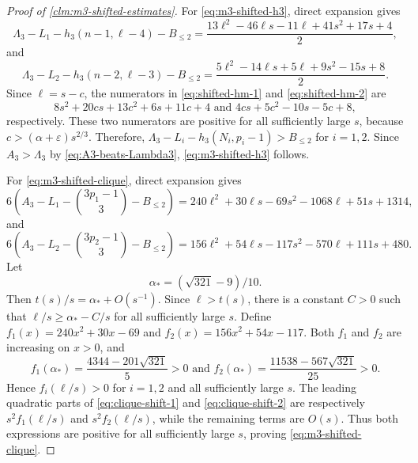 \documentclass[10pt,a4paper]{article}
\numberwithin{equation}{section}
\theoremstyle{definition}
\begin{document}
\begin{proof}[Proof of \cref{clm:m3-shifted-estimates}]
        For \eqref{eq:m3-shifted-h3}, direct expansion gives
        \begin{equation}\label{eq:shifted-hm-1}
                \Lambda_3-L_1-h_3(n-1,\ell-4)-B_{\le2}
                =\frac{13\ell^2-46\ell s-11\ell+41s^2+17s+4}{2},
        \end{equation}
        and
        \begin{equation}\label{eq:shifted-hm-2}
                \Lambda_3-L_2-h_3(n-2,\ell-3)-B_{\le2}
                =\frac{5\ell^2-14\ell s+5\ell+9s^2-15s+8}{2}.
        \end{equation}
        Since $\ell=s-c$, the numerators in \eqref{eq:shifted-hm-1} and \eqref{eq:shifted-hm-2} are
        \[
                8s^2+20cs+13c^2+6s+11c+4 \text{ and } 4cs+5c^2-10s-5c+8,
        \]
        respectively.
        These two numerators are positive for all sufficiently large $s$, because $c>(\alpha+\varepsilon)s^{2/3}$.
        Therefore, $\Lambda_3-L_i-h_3(N_i,p_i-1)>B_{\le2}$ for $i=1,2$.
        Since $A_3>\Lambda_3$ by \eqref{eq:A3-beats-Lambda3}, \eqref{eq:m3-shifted-h3} follows.

        For \eqref{eq:m3-shifted-clique}, direct expansion gives
        \begin{equation}\label{eq:clique-shift-1}
                6\left(A_3-L_1-\binom{3p_1-1}{3}-B_{\le2}\right)
                =240\ell^2+30\ell s-69s^2-1068\ell+51s+1314,
        \end{equation}
        and
        \begin{equation}\label{eq:clique-shift-2}
                6\left(A_3-L_2-\binom{3p_2-1}{3}-B_{\le2}\right)
                =156\ell^2+54\ell s-117s^2-570\ell+111s+480.
        \end{equation}
        Let
        \[
                \alpha_*=(\sqrt{321}-9)/10.
        \]
        Then $t(s)/s=\alpha_*+O(s^{-1})$. Since $\ell>t(s)$, there is a constant $C>0$ such that $\ell/s\ge \alpha_* - C/s$ for all sufficiently large $s$.
        Define $f_1(x)=240x^2+30x-69$ and $f_2(x)=156x^2+54x-117$.
        Both $f_1$ and $f_2$ are increasing on $x>0$, and
        \[
                f_1(\alpha_*)=\frac{4344-201\sqrt{321}}5>0 \text{ and }
                f_2(\alpha_*)=\frac{11538-567\sqrt{321}}{25}>0.
        \]
        Hence $f_i(\ell/s)>0$ for $i=1,2$ and all sufficiently large $s$.
        The leading quadratic parts of \eqref{eq:clique-shift-1} and \eqref{eq:clique-shift-2} are respectively
        $s^2f_1(\ell/s)$ and $s^2f_2(\ell/s)$, while the remaining terms are $O(s)$.
        Thus both expressions are positive for all sufficiently large $s$, proving \eqref{eq:m3-shifted-clique}.
\end{proof}
\end{document}

